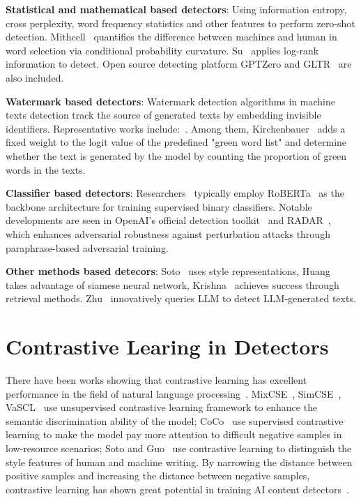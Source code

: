 \documentclass[11pt]{article}
\newcommand{\greenCite}[1]{\textcolor{darkgreen}{\cite{#1}}}
\newcommand{\greenCitep}[1]{\textcolor{darkgreen}{\citep{#1}}}
\begin{document}
	\textbf{Statistical and mathematical based detectors}: Using information entropy, cross perplexity, word frequency statistics and other features to perform zero-shot detection. Mithcell~\greenCite{mitchell2023detectgpt} quantifies the difference between machines and human in word selection via conditional probability curvature. Su~\greenCite{su2023detectllm} applies log-rank information to detect. Open source detecting platform GPTZero and GLTR~\greenCite{tian2023gptzero,gehrmann2019gltrstatisticaldetectionvisualization} are also included. 
	
	\textbf{Watermark based detectors}: Watermark detection algorithms in machine texts detection track the source of generated texts by embedding invisible identifiers. Representative works include:~\greenCite{gu2022watermarking,liu2024unforgeablepubliclyverifiablewatermark,hou2024clusteringbasedsemanticwatermark,lu2024entropybasedwatermarking}. Among them, Kirchenbauer~\greenCite{kirchenbauer2023watermark} adds a fixed weight to the logit value of the predefined "green word list" and determine whether the text is generated by the model by counting the proportion of green words in the texts. 
	
	\textbf{Classifier based detectors}: Researchers~\greenCite{Chen_2023,miao2024efficientdetection,mireshghallah2024smallerlanguagemodelsbetter,wang2023seqxgpt,liu2024checkgpt} typically employ RoBERTa~\greenCitep{liu2019roberta} as the backbone architecture for training supervised binary classifiers. Notable developments are seen in OpenAI's official detection toolkit~\greenCitep{solaiman2019releasestrategiessocialimpacts} and RADAR~\greenCitep{hu2023radarrobustaitextdetection}, which enhances adversarial robustness against perturbation attacks through paraphrase-based adversarial training. 
	
	\textbf{Other methods based detecors}: Soto~\greenCite{soto2024fewshotdetectionmachinegeneratedtext} uses style representations, Huang~\greenCite{huang2024ai} takes advantage of siamese neural network, Krishna~\greenCite{krishna2024paraphrasing} achieves success through retrieval methods. Zhu~\greenCite{zhu2023beatllm} innovatively queries LLM to detect LLM-generated texts.

	\section{Contrastive Learing in Detectors} 
	There have been works showing that contrastive learning has excellent performance in the field of natural language processing~\greenCitep{cheng2023ml}. MixCSE~\greenCitep{Zhang2022mixcse}, SimCSE~\greenCitep{gao2021simcse}, VaSCL~\greenCitep{zhang2022vascl} use unsupervised contrastive learning framework to enhance the semantic discrimination ability of the model; CoCo~\greenCitep{liu2023coco} use supervised contrastive learning to make the model pay more attention to difficult negative samples in low-resource scenarios; Soto and Guo~\greenCite{soto2024fewshot,guo2024detective} use contrastive learning to distinguish the style features of human and machine writing. By narrowing the distance between positive samples and increasing the distance between negative samples, contrastive learning has shown great potential in training AI content detectors~\greenCite{liu2024pecola}.
\end{document}
